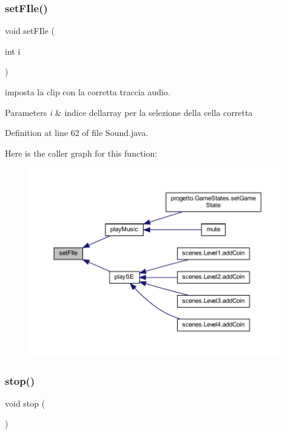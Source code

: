 \subsubsection{\texorpdfstring{set\+F\+Ile()}{setFIle()}}
{\footnotesize\ttfamily void set\+F\+Ile (\begin{DoxyParamCaption}\item[{int}]{i }\end{DoxyParamCaption})}



imposta la clip con la corretta traccia audio. 


\begin{DoxyParams}{Parameters}
{\em i} & indice dell\textquotesingle{}array per la selezione della cella corretta \\
\hline
\end{DoxyParams}


Definition at line 62 of file Sound.\+java.

Here is the caller graph for this function\+:\nopagebreak
\begin{figure}[H]
\begin{center}
\leavevmode
\includegraphics[width=350pt]{classprogetto_1_1_sound_a7dfb2cac645e127badf36478fd7aaa40_icgraph}
\end{center}
\end{figure}
\mbox{\label{classprogetto_1_1_sound_a8c528baf37154d347366083f0f816846}} 
\subsubsection{\texorpdfstring{stop()}{stop()}}
{\footnotesize\ttfamily void stop (\begin{DoxyParamCaption}{ }\end{DoxyParamCaption})}



